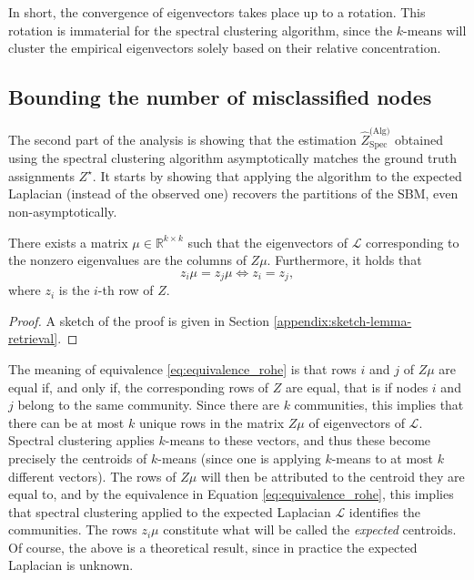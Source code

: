 \documentclass[../../main.tex]{subfiles} %
\begin{document}
	In short, the convergence of eigenvectors takes place up to a rotation. This 
	rotation is immaterial for the spectral clustering algorithm, since the 
	\(k\)-means will cluster the empirical eigenvectors solely based on their 
	relative concentration.
	
	\subsection{Bounding the number of misclassified nodes}  %
	The second part of the analysis is showing that the estimation 
	\(\hat{Z}_{\text{Spec}}^{\text{(Alg)}}\) obtained using the spectral clustering 
	algorithm asymptotically matches the ground truth assignments \(Z^\star\). It 
	starts by showing that applying the algorithm to the expected Laplacian (instead 
	of the observed one) recovers the partitions of the SBM, even non-asymptotically.
	\begin{lemma}
		There exists a matrix \(\mu \in \mathbb R^{k \times k}\) such that the 
		eigenvectors of \(\mathscr L\) corresponding to the nonzero eigenvalues are 
		the columns of \(Z \mu\). Furthermore, it holds that
		\begin{equation} \label{eq:equivalence_rohe}
			z_i \mu = z_j \mu \iff z_i = z_j,
		\end{equation}
		where \(z_i\) is the \(i\)-th row of \(Z\).
		\label{lemma:retrieval-expectation}
	\end{lemma}
	\begin{proof}
		A sketch of the proof is given in Section 
		\ref{appendix:sketch-lemma-retrieval}.
	\end{proof}

	The meaning of equivalence \eqref{eq:equivalence_rohe} is that rows \(i\) 
	and \(j\) of \(Z \mu\) are equal if, and only if, the corresponding rows of 
	\(Z\) are equal, that is if nodes \(i\) and \(j\) belong to the same community. 
	Since there are \(k\) communities, this implies that there can be at most \(k\) 
	unique rows in the matrix \(Z \mu\) of eigenvectors of \(\mathscr L\). 
	Spectral clustering applies \(k\)-means to these vectors, and thus these 
	become precisely the centroids of \(k\)-means (since one is applying 
	\(k\)-means to at most \(k\) different vectors). The rows of \(Z \mu\) will 
	then be attributed to the centroid they are equal to, and by the equivalence 
	in Equation \eqref{eq:equivalence_rohe}, this implies that spectral clustering 
	applied to the expected Laplacian \(\mathscr L\) identifies the communities. 
	The rows \(z_i \mu\) constitute what will be called the \textit{expected} 
	centroids. Of course, the above is a theoretical result, since in practice the 
	expected Laplacian is unknown.
	
\end{document}

